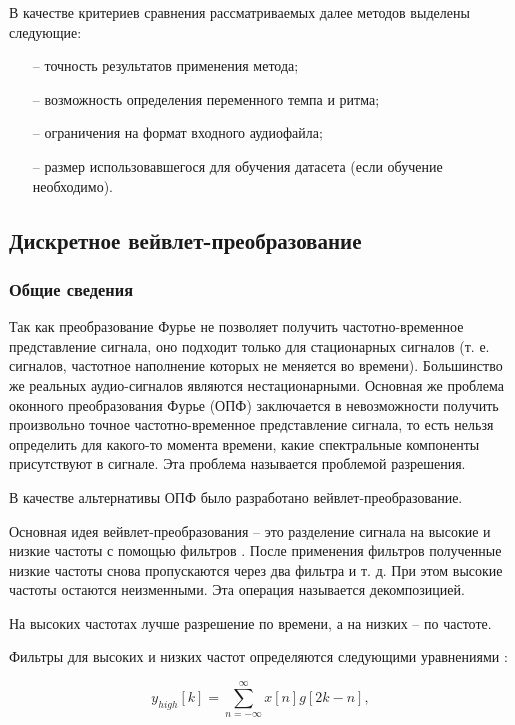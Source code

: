 В качестве критериев сравнения рассматриваемых далее методов выделены следующие:

\begin{itemize}
	\item[--] точность результатов применения метода;
	\item[--] возможность определения переменного темпа и ритма;
	\item[--] ограничения на формат входного аудиофайла;
	\item[--] размер использовавшегося для обучения датасета (если обучение необходимо).
\end{itemize}

\subsection{Дискретное вейвлет-преобразование}

\subsubsection{Общие сведения}

Так как преобразование Фурье не позволяет получить частотно-временное представление сигнала, оно подходит только для стационарных сигналов (т. е. сигналов, частотное наполнение которых не меняется во времени). Большинство же реальных аудио-сигналов являются нестационарными. Основная же проблема оконного преобразования Фурье (ОПФ) заключается в невозможности получить произвольно точное частотно-временное представление сигнала, то есть нельзя определить для какого-то момента времени, какие спектральные компоненты присутствуют в сигнале. Эта проблема называется проблемой разрешения.

В качестве альтернативы ОПФ было разработано вейвлет-преобразование.

Основная идея вейвлет-преобразования -- это разделение сигнала на высокие и низкие частоты с помощью фильтров \cite{polikar}. После применения фильтров полученные низкие частоты снова пропускаются через два фильтра и т. д. При этом высокие частоты остаются неизменными. Эта операция называется декомпозицией.

На высоких частотах лучше разрешение по времени, а на низких -- по частоте.

Фильтры для высоких и низких частот определяются следующими уравнениями \cite{dwt}:

\begin{equation}\label{eq:highpass}
	y_{high}[k] = \sum_{n=-\infty}^{\infty} x[n] g[2k-n],
\end{equation}

